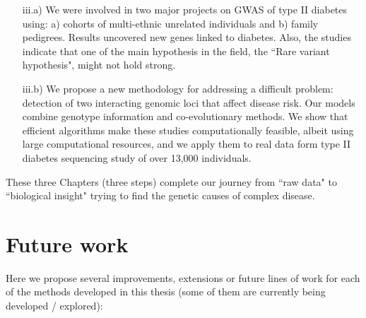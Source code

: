 \begin{itemize}
	\begin{itemize}
	\item[iii.a)] We were involved in two major projects on GWAS of type II diabetes using: a) cohorts of multi-ethnic unrelated individuals and b) family pedigrees. Results uncovered new genes linked to diabetes. Also, the studies indicate that one of the main hypothesis in the field, the ``Rare variant hypothesis", might not hold strong.
	
	\item[iii.b)] We propose a new methodology for addressing a difficult problem: detection of two interacting genomic loci that affect disease risk. Our models combine genotype information and co-evolutionary methods. We show that efficient algorithms make these studies computationally feasible, albeit using large computational resources, and we apply them to real data form type II diabetes sequencing study of over 13,000 individuals.
	\end{itemize}
\end{itemize}

These three Chapters (three steps) complete our journey from ``raw data" to ``biological insight" trying to find the genetic causes of complex disease.

\section{Future work}

Here we propose several improvements, extensions or future lines of work for each of the methods developed in this thesis (some of them are currently being developed / explored): \\


